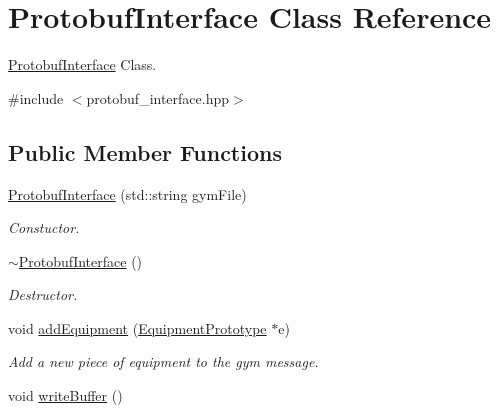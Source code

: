\hypertarget{class_protobuf_interface}{}\section{Protobuf\+Interface Class Reference}
\label{class_protobuf_interface}


\hyperlink{class_protobuf_interface}{Protobuf\+Interface} Class.  




{\ttfamily \#include $<$protobuf\+\_\+interface.\+hpp$>$}

\subsection*{Public Member Functions}
\begin{DoxyCompactItemize}
\item 
\hypertarget{class_protobuf_interface_a8c88fde7ed05fea4c1ab538f8c8aca45}{}\hyperlink{class_protobuf_interface_a8c88fde7ed05fea4c1ab538f8c8aca45}{Protobuf\+Interface} (std\+::string gym\+File)\label{class_protobuf_interface_a8c88fde7ed05fea4c1ab538f8c8aca45}

\begin{DoxyCompactList}\small\item\em Constuctor. \end{DoxyCompactList}\item 
\hypertarget{class_protobuf_interface_a678642544e3b285b8967bb4c9ff9dc03}{}\hyperlink{class_protobuf_interface_a678642544e3b285b8967bb4c9ff9dc03}{$\sim$\+Protobuf\+Interface} ()\label{class_protobuf_interface_a678642544e3b285b8967bb4c9ff9dc03}

\begin{DoxyCompactList}\small\item\em Destructor. \end{DoxyCompactList}\item 
\hypertarget{class_protobuf_interface_a4fcc7746952ac2d5631e99de56e40e79}{}void \hyperlink{class_protobuf_interface_a4fcc7746952ac2d5631e99de56e40e79}{add\+Equipment} (\hyperlink{class_equipment_prototype}{Equipment\+Prototype} $\ast$e)\label{class_protobuf_interface_a4fcc7746952ac2d5631e99de56e40e79}

\begin{DoxyCompactList}\small\item\em Add a new piece of equipment to the gym message. \end{DoxyCompactList}\item 
\hypertarget{class_protobuf_interface_ab98af826400aa8918a71849e0447834e}{}void \hyperlink{class_protobuf_interface_ab98af826400aa8918a71849e0447834e}{write\+Buffer} ()\label{class_protobuf_interface_ab98af826400aa8918a71849e0447834e}


\end{DoxyCompactItemize}
